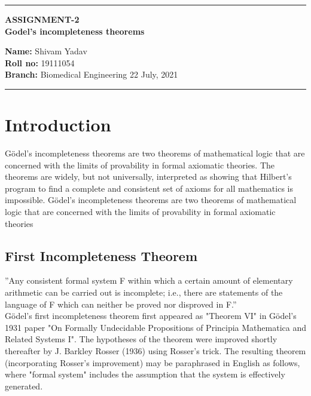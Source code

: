 \documentclass[10pt,a4paper,twoside]{article}
\begin{document}
\begin{center}
\hrule

\vspace{.4cm}
{\bf {\Large ASSIGNMENT-2 }}\\
\vspace{.3cm}
{\bf {\huge  Godel’s incompleteness theorems  }}
\vspace{.3cm}
\end{center}
{\bf Name:}  Shivam Yadav\\
{\bf Roll no:}  19111054 \\
{\bf Branch: }  Biomedical Engineering \hspace{\fill}  22 July, 2021 \\
\hrule

\vspace{.5cm}






\section{Introduction}
Gödel's incompleteness theorems are two theorems of mathematical logic that are concerned with the limits of provability in formal axiomatic theories. The theorems are widely, but not universally, interpreted as showing that Hilbert's program to find a complete and consistent set of axioms for all mathematics is impossible.
Gödel's incompleteness theorems are two theorems of mathematical logic that are concerned with the limits of provability in formal axiomatic theories
 

\subsection{First Incompleteness Theorem  }
”Any consistent formal system F within which a certain amount of elementary arithmetic
can be carried out is incomplete; i.e., there are statements of the language of F which can neither be proved nor disproved in F.”\\
Gödel's first incompleteness theorem first appeared as "Theorem VI" in Gödel's 1931 paper "On Formally Undecidable Propositions of Principia Mathematica and Related Systems I". The hypotheses of the theorem were improved shortly thereafter by J. Barkley Rosser (1936) using Rosser's trick. The resulting theorem (incorporating Rosser's improvement) may be paraphrased in English as follows, where "formal system" includes the assumption that the system is effectively generated.
\end{document}
